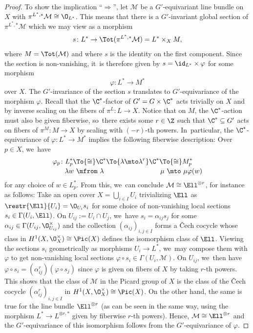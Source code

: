 \begin{proof}
To show the implication ``$\Rightarrow$'', let $\mathcal M$ be a $G'$-equivariant line bundle on $X$ with $\pi^{L^*,*} \mathcal M \cong \O_{L^*}$. This means that there is a $G'$-invariant global section of $\pi^{L^*,*} \mathcal M$ which we may view as a morphism
\[
s \colon L^* \to \Tot(\pi^{L^*,*} \mathcal M) = L^* \times_X M,
\]
where $M = \Tot(\mathcal M)$ and where $s$ is the identity on the first component. Since the section is non-vanishing, it~is therefore given by $s = \id_{L^*} \times \varphi$ for some morphism
\[
\varphi \colon L^* \to M^*
\]
over $X$. The $G'$-invariance of the section $s$ translates to $G'$-equivariance of the morphism $\varphi$. Recall that the $\C^*$-factor of $G'=G \times \C^*$ acts trivially on $X$ and by inverse scaling on the fibers of $\pi^{L} \colon L \to X$. Notice that on $M$, the $\C^*$-action must also be given fiberwise, so~there exists some $r \in \Z$ such that $\C^* \subseteq G'$ acts on fibers of $\pi^{M}\colon M \to X$ by scaling with $(-r)$-th powers. In~particular, the $\C^*$-equivariance of $\varphi \colon L^* \to M^*$ implies the following fiberwise description: Over $p \in X$, we~have
\begin{align*}
\varphi_p \colon L_p^* \To{\cong} \C^* &\To{\lambda \mto \lambda^r} \C^* \To{\cong} M_p^* \\[
-0.25em]
\lambda w \ \mfrom \ \lambda \ &\hphantom{\To{\lambda \mto \lambda^r}{}} \ \ \mu \ \mto \ \mu \varphi(w)
\end{align*}
for any choice of $w \in L_p^*$.
From this, we~can conclude $\mathcal M \cong \Ell^{\otimes r}$, for instance as follows: Take an open cover $X = \bigcup_{i \in I} U_i$ trivializing $\Ell$ as $\restr{\Ell}{U_i} = \O_{U_i} s_i$ for some choice of non-vanishing local sections $s_i \in \Gamma(U_i,\Ell)$. On $U_{ij} := U_i \cap U_j$, we~have $s_i = \alpha_{ij} s_j$ for some $\alpha_{ij} \in \Gamma(U_{ij}, \O_{U_{ij}}^\times)$ and the collection $(\alpha_{ij})_{i,j \in I}$ forms a {\v{C}}ech cocycle whose class in $H^1(X,\O_X^\times) \cong \Pic(X)$ defines the isomorphism class of $\Ell$. Viewing the sections $s_i$ geometrically as morphisms $U_i \to L^*$, we~may compose them with $\varphi$ to get non-vanishing local sections $\varphi \circ s_i \in \Gamma(U_i, \mathcal M)$. On $U_{ij}$, we~then have $\varphi \circ s_i = (\alpha_{ij}^r) (\varphi \circ s_j)$ since $\varphi$ is given on fibers of $X$ by taking $r$-th powers. This shows that the class of $\mathcal M$ in the Picard group of $X$ is the class of the {\v{C}}ech cocycle $(\alpha_{ij}^r)_{i,j \in I}$ in $H^1(X,\O_X^\times) \cong \Pic(X)$. On the other hand, the same is true for the line bundle $\Ell^{\otimes r}$ (as can \eg be seen in the same way, using the morphism $L^* \to L^{\otimes r,*}$ given by fiberwise $r$-th powers). Hence, $\mathcal M \cong \Ell^{\otimes r}$ and the $G'$-equivariance of this isomorphism follows from the $G'$-equivariance of $\varphi$.
\end{proof}

